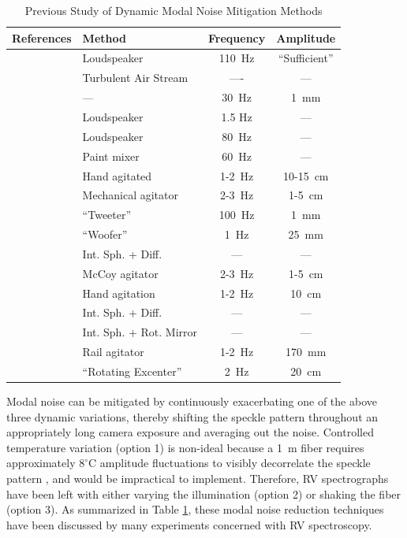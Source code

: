 \documentclass[11pt]{article}
\begin{document}
\begin{table}
\centering
\small
\caption{Previous Study of Dynamic Modal Noise Mitigation Methods}
	\small
	\begin{tabular}{llcc}
		\hline
		References & Method & Frequency & Amplitude \\
		\hline\hline
		\citet{Daino1980} & Loudspeaker & \SI{110}{\hertz} & ``Sufficient'' \\
		\hline
		\citet{Hill1980} & Turbulent Air Stream & ---- & --- \\
		\hline
		\citet{Baudrand2001} & --- & \SI{30}{\hertz} & \SI{1}{\milli\meter} \\
		\hline
		\multirow{2}{*}{\citet{Lemke2011}} & Loudspeaker & 1.5 Hz & --- \\
		 & Loudspeaker & \SI{80}{\hertz} & --- \\
		\hline
		\multirow{3}{*}{\citet{McCoy2012}} & Paint mixer & \SI{60}{\hertz} & --- \\
		 & Hand agitated & 1-\SI{2}{\hertz} & 10-\SI{15}{\centi\meter} \\
		 & Mechanical agitator & 2-\SI{3}{\hertz} & 1-\SI{5}{\centi\meter} \\
		\hline
		\multirow{2}{*}{\citet{Plavchan2013}} & ``Tweeter'' & \SI{100}{\hertz} & \SI{1}{\milli\meter} \\
		 & ``Woofer'' & \SI{1}{\hertz} & \SI{25}{\milli\meter} \\
		\hline
		\multirow{3}{*}{\citet{Mahadevan2014}} & Int. Sph. + Diff. & --- & ---\\
		 & McCoy agitator & 2-\SI{3}{\hertz} & 1-\SI{5}{\centi\meter} \\
		 & Hand agitation & 1-\SI{2}{\hertz} & \SI{10}{\centi\meter} \\
		\hline
		\multirow{2}{*}{\citet{Halverson2014}} & Int. Sph. + Diff. & --- & --- \\
		 & Int. Sph. + Rot. Mirror & --- & --- \\
		\hline		
		\citet{Roy2014} & Rail agitator & 1-\SI{2}{\hertz} & \SI{170}{\milli\meter} \\
		\hline
		\citet{Sablowski2016} & ``Rotating Excenter'' & \SI{2}{\hertz} & \SI{20}{\centi\meter} \\
		\hline
	\end{tabular}
\label{table:previous_studies}
\end{table}

Modal noise can be mitigated by continuously exacerbating one of the above three dynamic variations, thereby shifting the speckle pattern throughout an appropriately long camera exposure and averaging out the noise. Controlled temperature variation (option 1) is non-ideal because a \SI{1}{\meter} fiber requires approximately $8 ^\circ \mathrm{C}$ amplitude fluctuations to visibly decorrelate the speckle pattern \citep{Redding2013}, and would be impractical to implement. Therefore, RV spectrographs have been left with either varying the illumination (option 2) or shaking the fiber (option 3). As summarized in Table \ref{table:previous_studies}, these modal noise reduction techniques have been discussed by many experiments concerned with RV spectroscopy.
\end{document}
